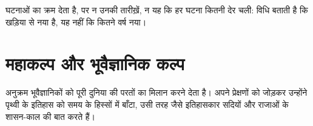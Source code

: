  घटनाओं का क्रम देता है, पर न उनकी तारीख़ें, न यह कि हर घटना
कितनी देर चली: विधि बताती है कि  खड़िया से नया है, यह नहीं कि कितने
वर्ष नया।

\section{महाकल्प और भूवैज्ञानिक कल्प}

 अनुक्रम भूवैज्ञानिकों को पूरी दुनिया की परतों का मिलान करने देता है। अपने
प्रेक्षणों को जोड़कर उन्होंने पृथ्वी के इतिहास को समय के हिस्सों में बाँटा, उसी तरह
जैसे इतिहासकार सदियों और राजाओं के शासन-काल की बात
करते हैं।

